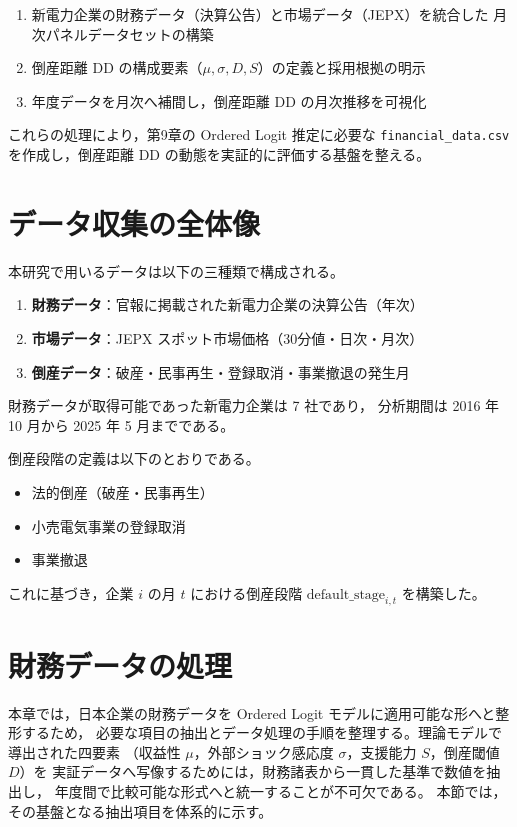 \begin{enumerate}
  \item 新電力企業の財務データ（決算公告）と市場データ（JEPX）を統合した
        月次パネルデータセットの構築
  \item 倒産距離 DD の構成要素（$\mu,\sigma,D,S$）の定義と採用根拠の明示
  \item 年度データを月次へ補間し，倒産距離 DD の月次推移を可視化
\end{enumerate}

これらの処理により，第9章の Ordered Logit 推定に必要な
\texttt{financial\_data.csv} を作成し，倒産距離 DD の動態を実証的に評価する基盤を整える。

\section{データ収集の全体像}

本研究で用いるデータは以下の三種類で構成される。

\begin{enumerate}
\item \textbf{財務データ}：官報に掲載された新電力企業の決算公告（年次）
\item \textbf{市場データ}：JEPX スポット市場価格（30分値・日次・月次）
\item \textbf{倒産データ}：破産・民事再生・登録取消・事業撤退の発生月
\end{enumerate}

財務データが取得可能であった新電力企業は 7 社であり，
分析期間は 2016 年 10 月から 2025 年 5 月までである。

倒産段階の定義は以下のとおりである。

\begin{itemize}
\item 法的倒産（破産・民事再生）
\item 小売電気事業の登録取消
\item 事業撤退
\end{itemize}

これに基づき，企業 $i$ の月 $t$ における倒産段階 $\text{default\_stage}_{i,t}$ を構築した。

\section{財務データの処理}

本章では，日本企業の財務データを Ordered Logit モデルに適用可能な形へと整形するため，
必要な項目の抽出とデータ処理の手順を整理する。理論モデルで導出された四要素
（収益性 $\mu$，外部ショック感応度 $\sigma$，支援能力 $S$，倒産閾値 $D$）を
実証データへ写像するためには，財務諸表から一貫した基準で数値を抽出し，
年度間で比較可能な形式へと統一することが不可欠である。
本節では，その基盤となる抽出項目を体系的に示す。

